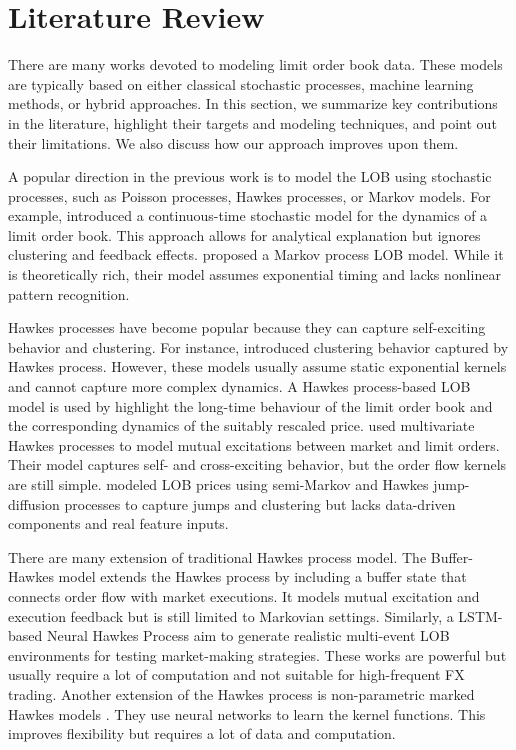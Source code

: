 \section{Literature Review}
There are many works devoted to modeling limit order book data. These models are typically based on either classical stochastic processes, machine learning methods, or hybrid approaches. In this section, we summarize key contributions in the literature, highlight their targets and modeling techniques, and point out their limitations. We also discuss how our approach improves upon them.

A popular direction in the previous work is to model the LOB using stochastic processes, such as Poisson processes, Hawkes processes, or Markov models. For example, \cite{cont_stochastic_2010} introduced a continuous-time stochastic model for the dynamics of a limit order book. This approach allows for analytical explanation but ignores clustering and feedback effects. 
\cite{bleher_orders_2021} proposed a Markov process LOB model. While it is theoretically rich, their model assumes exponential timing and lacks nonlinear pattern recognition.

Hawkes processes have become popular because they can capture self-exciting behavior and clustering. For instance, \cite{fonseca_clustering_2015} introduced clustering behavior captured by Hawkes process. However, these models usually assume static exponential kernels and cannot capture more complex dynamics. A Hawkes process-based LOB model is used by \cite{abergel_long-time_2015} highlight the long-time behaviour of the limit order book and the corresponding dynamics of the suitably rescaled price. \cite{zheng_ergodicity_2013} used multivariate Hawkes processes to model mutual excitations between market and limit orders. Their model captures self- and cross-exciting behavior, but the order flow kernels are still simple. \cite{lalor_algorithmic_2025} modeled LOB prices using semi-Markov and Hawkes jump-diffusion processes to capture jumps and clustering but lacks data-driven components and real feature inputs.

There are many extension of traditional Hawkes process model. The Buffer-Hawkes model \citep{kaj_buffer_2017} extends the Hawkes process by including a buffer state that connects order flow with market executions. It models mutual excitation and execution feedback but is still limited to Markovian settings. Similarly, a LSTM-based Neural Hawkes Process \citep{lalor_event-based_2025} aim to generate realistic multi-event LOB environments for testing market-making strategies. These works are powerful but usually require a lot of computation and not suitable for high-frequent FX trading. Another extension of the Hawkes process is non-parametric marked Hawkes models \citep{joseph_non-parametric_2024}. They use neural networks to learn the kernel functions. This improves flexibility but requires a lot of data and computation.

